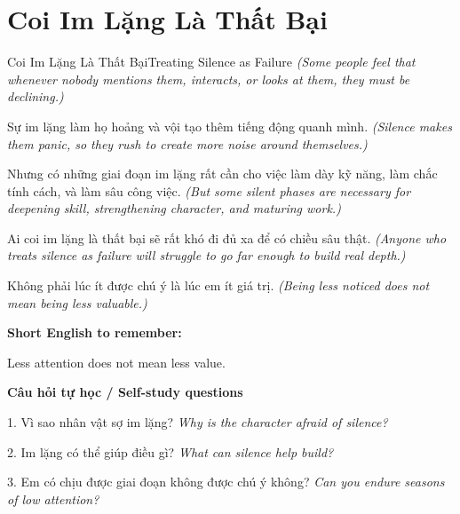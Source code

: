 \section{Coi Im Lặng Là Thất Bại}
\begin{truyen}{Coi Im Lặng Là Thất Bại}{Treating Silence as Failure}
\textit{(Some people feel that whenever nobody mentions them, interacts, or looks at them, they must be declining.)}

Sự im lặng làm họ hoảng và vội tạo thêm tiếng động quanh mình.
\textit{(Silence makes them panic, so they rush to create more noise around themselves.)}

Nhưng có những giai đoạn im lặng rất cần cho việc làm dày kỹ năng, làm chắc tính cách, và làm sâu công việc.
\textit{(But some silent phases are necessary for deepening skill, strengthening character, and maturing work.)}

Ai coi im lặng là thất bại sẽ rất khó đi đủ xa để có chiều sâu thật.
\textit{(Anyone who treats silence as failure will struggle to go far enough to build real depth.)}

\end{truyen}

\begin{baihoc}
Không phải lúc ít được chú ý là lúc em ít giá trị.
\textit{(Being less noticed does not mean being less valuable.)}
\end{baihoc}

\begin{ghinhoanh}
\textbf{Short English to remember:}

Less attention does not mean less value.

\end{ghinhoanh}

\begin{tuhocnhanh}
\textbf{Câu hỏi tự học / Self-study questions}

1. Vì sao nhân vật sợ im lặng? \textit{Why is the character afraid of silence?}

2. Im lặng có thể giúp điều gì? \textit{What can silence help build?}

3. Em có chịu được giai đoạn không được chú ý không? \textit{Can you endure seasons of low attention?}
\end{tuhocnhanh}
\ngancach

